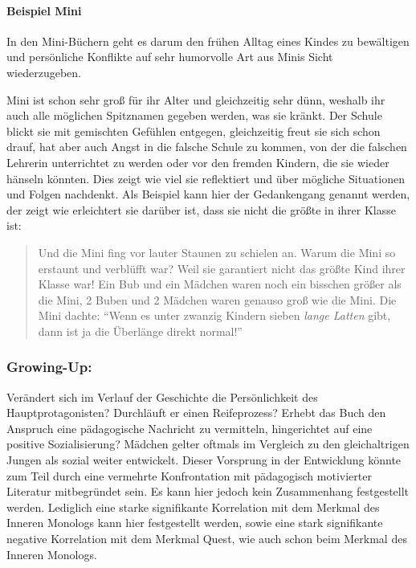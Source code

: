 \paragraph{Beispiel Mini}

In den Mini-Büchern geht es darum den frühen Alltag eines Kindes zu
bewältigen und persönliche Konflikte auf sehr humorvolle Art aus Minis
Sicht wiederzugeben.

Mini ist schon sehr groß für ihr Alter und gleichzeitig sehr dünn,
weshalb ihr auch alle möglichen Spitznamen gegeben werden, was sie
kränkt. Der Schule blickt sie mit gemischten Gefühlen entgegen,
gleichzeitig freut sie sich schon drauf, hat aber auch Angst in die
falsche Schule zu kommen, von der die falschen Lehrerin unterrichtet zu
werden oder vor den fremden Kindern, die sie wieder hänseln könnten.
Dies zeigt wie viel sie reflektiert und über mögliche Situationen und
Folgen nachdenkt. Als Beispiel kann hier der Gedankengang genannt
werden, der zeigt wie erleichtert sie darüber ist, dass sie nicht die
größte in ihrer Klasse ist:

\begin{quote}
Und die Mini fing vor lauter Staunen zu schielen an. \textelp{} Warum
die Mini so erstaunt und verblüfft war? Weil sie garantiert nicht das
größte Kind ihrer Klasse war! Ein Bub und ein Mädchen waren noch ein
bisschen größer als die Mini, 2 Buben und 2 Mädchen waren genauso groß
wie die Mini. Die Mini dachte:
\enquote{Wenn es unter zwanzig Kindern sieben \emph{lange Latten} gibt, dann ist ja die Überlänge direkt normal!}\parencite[][61]{Noestlinger2011}
\end{quote}

\subsubsection{Growing-Up:}

Verändert sich im Verlauf der Geschichte die Persönlichkeit des
Hauptprotagonisten? Durchläuft er einen Reifeprozess? Erhebt das Buch
den Anspruch eine pädagogische Nachricht zu vermitteln, hingerichtet auf
eine positive Sozialisierung? Mädchen gelter oftmals im Vergleich zu den
gleichaltrigen Jungen als sozial weiter entwickelt. Dieser Vorsprung in
der Entwicklung könnte zum Teil durch eine vermehrte Konfrontation mit
pädagogisch motivierter Literatur mitbegründet sein. Es kann hier jedoch
kein Zusammenhang festgestellt werden. Lediglich eine starke
signifikante Korrelation mit dem Merkmal des Inneren Monologs kann hier
festgestellt werden, sowie eine stark signifikante negative Korrelation
mit dem Merkmal Quest, wie auch schon beim Merkmal des Inneren Monologs.

